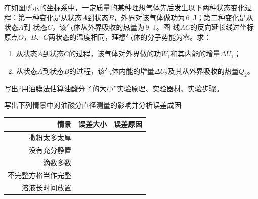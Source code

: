 \newpage
{}在如图所示的坐标系中，一定质量的某种理想气体先后发生以下两种状态变化过程：第一种变化是从状态\(A\)到状态\(B\)，外界对该气体做功为\,\qty{6}{J}；第二种变化是从状态\(A\)到	状态\(C\)，该气体从外界吸收的热量为\,\qty{9}{J}。图	线\(AC\)的反向延长线过坐标原点\(O\)，\(B\)、\(C\)两状态的温度相同，理想气体的分子势能为零。求：
	\begin{enumerate}
		\item[(1)] 从状态\(A\)到状态\(C\)的过程，该气体对外界做的功\(W_1\)和其内能的增量\(\Delta U_1\)；
		\item[(2)] 从状态\(A\)到状态\(B\)的过程，该气体内能的增量\(\Delta U_2\)及其从外界吸收的热量\(Q_2\)。
	\end{enumerate}

写出“用油膜法估算油酸分子的大小”实验原理、实验器材、实验步骤。
\vspace*{11cm}

写出下列情景中对油酸分直径测量的影响并分析误差成因

\begin{table}[htbp]
    \begin{tabular}{r|c|p{8cm}}
        \hline
        情景&误差大小&误差原因\\
        \hline
        撒粉太多太厚&&\\
        \hline
        没有充分静置&&\\
        \hline
        滴数多数&&\\
        \hline
        不完整方格当作完整&&\\
        \hline
        溶液长时间放置&&\\
        \hline
    \end{tabular}
\end{table}